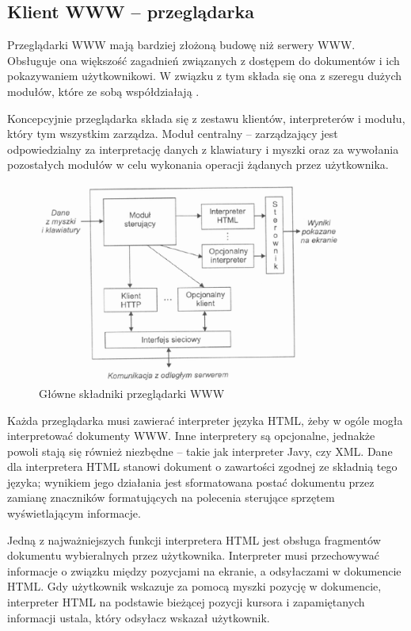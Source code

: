 \subsection{Klient WWW -- przeglądarka}

\hspace{0.63cm}Przeglądarki WWW mają bardziej złożoną budowę niż serwery WWW. Obsługuje ona większość zagadnień związanych
z dostępem do dokumentów i ich pokazywaniem użytkownikowi. W związku z tym składa się ona z szeregu dużych modułów, które
ze sobą współdziałają \cite{siecikomputerowe}.

Koncepcyjnie przeglądarka składa się z zestawu klientów, interpreterów i modułu, który tym wszystkim zarządza. Moduł
centralny -- zarządzający jest odpowiedzialny za interpretację danych z klawiatury i myszki oraz za wywołania pozostałych
modułów w celu wykonania operacji żądanych przez użytkownika.

\begin{figure}[h]
\centering
\includegraphics[width=4in]{./rysunki/przeg.eps}
\caption{Główne składniki przeglądarki WWW}
\label{przeglądarka}
\end{figure}

Każda przeglądarka musi zawierać interpreter języka HTML, żeby w ogóle mogła interpretować dokumenty WWW. Inne interpretery
są opcjonalne, jednakże powoli stają się również niezbędne -- takie jak interpreter Javy, czy XML. Dane dla interpretera
HTML stanowi dokument o zawartości zgodnej ze składnią tego języka; wynikiem jego działania jest sformatowana postać
dokumentu przez zamianę znaczników formatujących na polecenia sterujące sprzętem wyświetlającym informacje.

Jedną z najważniejszych funkcji interpretera HTML jest obsługa fragmentów dokumentu wybieralnych przez użytkownika.
Interpreter musi przechowywać informacje o związku między pozycjami na ekranie, a odsyłaczami w dokumencie HTML. Gdy
użytkownik wskazuje za pomocą myszki pozycję w dokumencie, interpreter HTML na podstawie bieżącej pozycji kursora i
zapamiętanych informacji ustala, który odsyłacz wskazał użytkownik.

